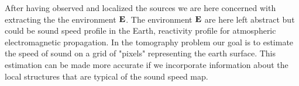 
After having observed and localized the sources we are here concerned with extracting the the environment $\bf E$. The environment $\bf E$ are here left abstract but could be sound speed profile in the Earth, reactivity profile for atmospheric electromagnetic propagation.
In the tomography problem our goal is to estimate the speed of sound on a grid of "pixels" 
representing the earth surface. This estimation can be made more accurate if we incorporate information
about the local structures that are typical of the sound speed map.

